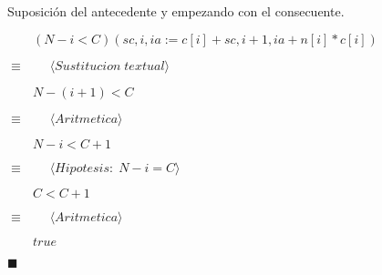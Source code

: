 \documentclass[hidelinks]{article}
\begin{document}
Suposición del antecedente y empezando con el consecuente. \par

$\qquad (N-i<C)(sc, i, ia := c[i]+sc, i + 1, ia+n[i]*c[i])$ \par
$\equiv  \qquad \langle Sustitucion \; textual \rangle$ \par
$\qquad N-(i+1)<C$ \par
$\equiv  \qquad \langle Aritmetica \rangle$ \par
$\qquad N-i<C+1$ \par
$\equiv  \qquad \langle Hipotesis: \; N-i=C \rangle$ \par
$\qquad C<C+1$ \par
$\equiv  \qquad \langle Aritmetica \rangle$ \par
$\qquad true$ \par

$\blacksquare$
\end{document}
